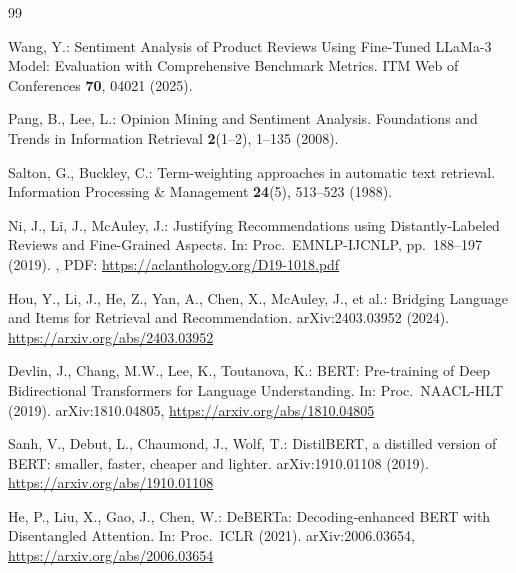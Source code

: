 \documentclass[runningheads]{llncs}
\begin{document}
\begin{thebibliography}{99}

Wang, Y.: Sentiment Analysis of Product Reviews Using Fine-Tuned LLaMa-3 Model: Evaluation with Comprehensive Benchmark Metrics. ITM Web of Conferences \textbf{70}, 04021 (2025). 

Pang, B., Lee, L.: Opinion Mining and Sentiment Analysis. Foundations and Trends in Information Retrieval \textbf{2}(1--2), 1--135 (2008). 

Salton, G., Buckley, C.: Term-weighting approaches in automatic text retrieval. Information Processing \& Management \textbf{24}(5), 513--523 (1988). 

Ni, J., Li, J., McAuley, J.: Justifying Recommendations using Distantly-Labeled Reviews and Fine-Grained Aspects. In: Proc.\ EMNLP-IJCNLP, pp.\ 188--197 (2019). , PDF: \url{https://aclanthology.org/D19-1018.pdf}

Hou, Y., Li, J., He, Z., Yan, A., Chen, X., McAuley, J., et al.: Bridging Language and Items for Retrieval and Recommendation. arXiv:2403.03952 (2024). \url{https://arxiv.org/abs/2403.03952}

Devlin, J., Chang, M.W., Lee, K., Toutanova, K.: BERT: Pre-training of Deep Bidirectional Transformers for Language Understanding. In: Proc.\ NAACL-HLT (2019). arXiv:1810.04805, \url{https://arxiv.org/abs/1810.04805}

Sanh, V., Debut, L., Chaumond, J., Wolf, T.: DistilBERT, a distilled version of BERT: smaller, faster, cheaper and lighter. arXiv:1910.01108 (2019). \url{https://arxiv.org/abs/1910.01108}

He, P., Liu, X., Gao, J., Chen, W.: DeBERTa: Decoding-enhanced BERT with Disentangled Attention. In: Proc.\ ICLR (2021). arXiv:2006.03654, \url{https://arxiv.org/abs/2006.03654}


\end{thebibliography}
\end{document}
